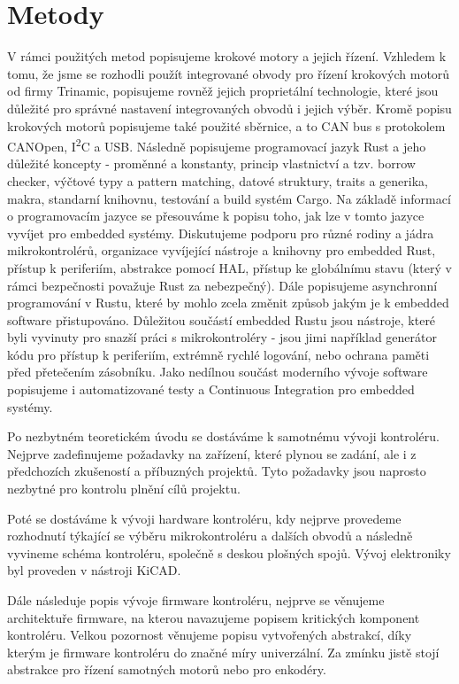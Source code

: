 \section*{Metody}
V rámci použitých metod popisujeme krokové motory a jejich řízení.
Vzhledem k tomu, že jsme se rozhodli použít integrované obvody pro řízení krokových motorů od firmy Trinamic, popisujeme rovněž jejich proprietální technologie, které jsou důležité pro správné nastavení integrovaných obvodů i jejich výběr.
Kromě popisu krokových motorů popisujeme také použité sběrnice, a to CAN bus s protokolem CANOpen, I\textsuperscript{2}C a USB.
Následně popisujeme programovací jazyk Rust a jeho důležité koncepty - proměnné a konstanty, princip vlastnictví a tzv. borrow checker, výčtové typy a pattern matching, datové struktury, traits a generika, makra, standarní knihovnu, testování a build systém Cargo.
Na základě informací o programovacím jazyce se přesouváme k popisu toho, jak lze v tomto jazyce vyvíjet pro embedded systémy.
Diskutujeme podporu pro různé rodiny a jádra mikrokontrolérů, organizace vyvíjející nástroje a knihovny pro embedded Rust, přístup k periferiím, abstrakce pomocí HAL, přístup ke globálnímu stavu (který v rámci bezpečnosti považuje Rust za nebezpečný).
Dále popisujeme asynchronní programování v Rustu, které by mohlo zcela změnit způsob jakým je k embedded software přistupováno.
Důležitou součástí embedded Rustu jsou nástroje, které byli vyvinuty pro snazší práci s mikrokontroléry - jsou jimi například generátor kódu pro přístup k periferiím, extrémně rychlé logování, nebo ochrana paměti před přetečením zásobníku.
Jako nedílnou součást moderního vývoje software popisujeme i automatizované testy a Continuous Integration pro embedded systémy.

Po nezbytném teoretickém úvodu se dostáváme k samotnému vývoji kontroléru.
Nejprve zadefinujeme požadavky na zařízení, které plynou se zadání, ale i z předchozích zkušeností a příbuzných projektů.
Tyto požadavky jsou naprosto nezbytné pro kontrolu plnění cílů projektu.

Poté se dostáváme k vývoji hardware kontroléru, kdy nejprve provedeme rozhodnutí týkající se výběru mikrokontroléru a dalších obvodů a následně vyvineme schéma kontroléru, společně s deskou plošných spojů.
Vývoj elektroniky byl proveden v nástroji KiCAD.

Dále následuje popis vývoje firmware kontroléru, nejprve se věnujeme architektuře firmware, na kterou navazujeme popisem kritických komponent kontroléru.
Velkou pozornost věnujeme popisu vytvořených abstrakcí, díky kterým je firmware kontroléru do značné míry univerzální.
Za zmínku jistě stojí abstrakce pro řízení samotných motorů nebo pro enkodéry.

